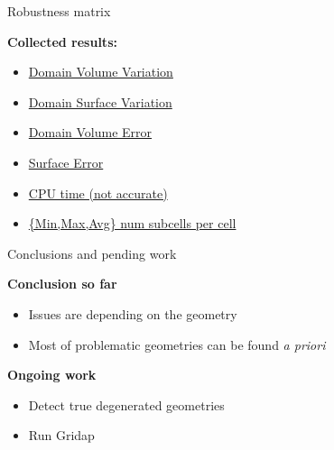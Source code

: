 \documentclass{beamer}
\begin{document}
\begin{frame}{Robustness matrix}
  
  \textbf{Collected results:}

  \begin{itemize}
    \item  
      \href{run:domain_volume.pdf}{Domain Volume Variation}
    \item
      \href{run:domain_surface.pdf}{Domain Surface Variation}
    \item
      \href{run:volume_error.pdf}{Domain Volume Error}
    \item
      \href{run:surface_error.pdf}{Surface Error}
    \item
      \href{run:time.pdf}{CPU time (not accurate)}
    \item
      \href{run:subcells_x_cell.pdf}{\{Min,Max,Avg\} num subcells per cell }
  \end{itemize}


\end{frame}


\begin{frame}{Conclusions and pending work}

  \textbf{Conclusion so far}
  \begin{itemize}
    \item
      Issues are depending on the geometry
    \item
      Most of problematic geometries can be found \textit{a priori}
  \end{itemize}
  \textbf{Ongoing work}
  \begin{itemize}
    \item
      Detect true degenerated geometries
    \item
      Run Gridap
  \end{itemize}


\end{frame}
\end{document}

